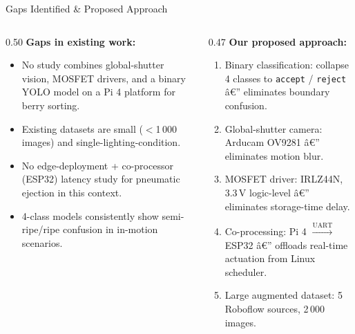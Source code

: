 \documentclass[aspectratio=169, 11pt]{beamer}
\begin{document}
\begin{frame}{Gaps Identified \& Proposed Approach}
\begin{columns}[T]
  \begin{column}{0.50\textwidth}
    \textbf{Gaps in existing work:}
    \begin{itemize}
      \item No study combines global-shutter vision, MOSFET drivers,
            and a binary YOLO model on a Pi 4 platform for berry sorting.
      \item Existing datasets are small ($<$1\,000 images) and
            single-lighting-condition.
      \item No edge-deployment + co-processor (ESP32) latency study
            for pneumatic ejection in this context.
      \item 4-class models consistently show semi-ripe/ripe confusion
            in in-motion scenarios.
    \end{itemize}
  \end{column}
  \begin{column}{0.47\textwidth}
    \textbf{Our proposed approach:}
    \begin{enumerate}\setlength{\itemsep}{2pt}
      \item \alert{Binary classification:} collapse 4 classes to
            \texttt{accept} / \texttt{reject} â€” eliminates boundary confusion.
      \item \alert{Global-shutter camera:} Arducam OV9281 â€” eliminates motion blur.
      \item \alert{MOSFET driver:} IRLZ44N, 3.3\,V logic-level â€” eliminates
            storage-time delay.
      \item \alert{Co-processing:} Pi 4 $\xrightarrow{\text{UART}}$ ESP32 â€”
            offloads real-time actuation from Linux scheduler.
      \item \alert{Large augmented dataset:} 5 Roboflow sources, 2\,000 images.
    \end{enumerate}
  \end{column}
\end{columns}
\end{frame}
\end{document}
